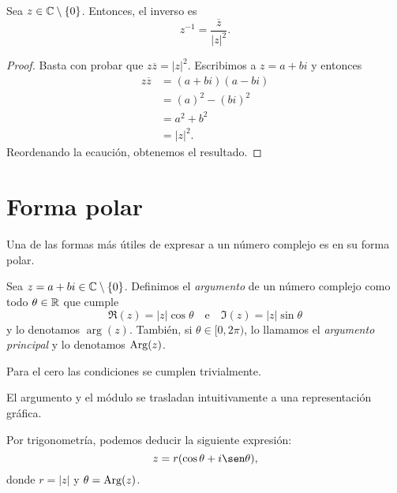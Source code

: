 \begin{proposition}
    Sea $z \in \mathbb{C} \setminus \{0\}$. Entonces, el inverso es
    \begin{equation*}
        z^{-1} = \frac{\overline{z}}{|z|^2}.
    \end{equation*}
\end{proposition}

\begin{proof}
    Basta con probar que $z \overline{z} = |z|^2$. Escribimos a $z = a + bi$ y entonces 
    \begin{align*}
        z \overline{z} &= (a + bi) (a - bi) \\
        &= (a)^2 - (bi)^2 \\
        &= a^2 + b^2 \\
        &= |z|^2.
    \end{align*}
    Reordenando la ecaución, obtenemos el resultado.
\end{proof}


\section{Forma polar}

Una de las formas más útiles de expresar a un número complejo es en su forma polar.

\begin{definition}
    Sea $z = a + bi \in \mathbb{C} \setminus \{0\}$. Definimos el \emph{argumento} de un número complejo como todo $\theta \in \mathbb{R}$ que cumple
    \begin{equation*}
        \Re(z) = |z| \cos \theta \quad\text{e}\quad \Im(z) = |z| \sin \theta
    \end{equation*}
    y lo denotamos $\arg(z)$. También, si $\theta \in [0, 2\pi)$, lo llamamos el \emph{argumento principal} y lo denotamos $\operatorname{Arg}(z)$.
\end{definition}

\begin{remark}
    Para el cero las condiciones se cumplen trivialmente.
\end{remark}

El argumento y el módulo se trasladan intuitivamente a una representación gráfica.



Por trigonometría, podemos deducir la siguiente expresión:
\begin{equation*}
    z = r (\cos \theta + i \sen \theta),
\end{equation*}
donde $r = |z|$ y $\theta = \operatorname{Arg}(z)$. 

